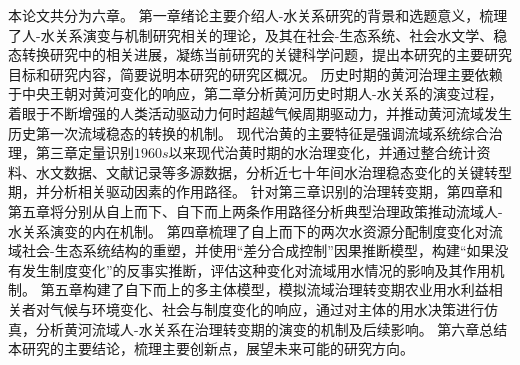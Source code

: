 本论文共分为六章。
第一章绪论主要介绍人-水关系研究的背景和选题意义，梳理了人-水关系演变与机制研究相关的理论，及其在社会-生态系统、社会水文学、稳态转换研究中的相关进展，凝练当前研究的关键科学问题，提出本研究的主要研究目标和研究内容，简要说明本研究的研究区概况。
历史时期的黄河治理主要依赖于中央王朝对黄河变化的响应，第二章分析黄河历史时期人-水关系的演变过程，着眼于不断增强的人类活动驱动力何时超越气候周期驱动力，并推动黄河流域发生历史第一次流域稳态的转换的机制。
现代治黄的主要特征是强调流域系统综合治理，第三章定量识别$1960s$以来现代治黄时期的水治理变化，并通过整合统计资料、水文数据、文献记录等多源数据，分析近七十年间水治理稳态变化的关键转型期，并分析相关驱动因素的作用路径。
针对第三章识别的治理转变期，第四章和第五章将分别从自上而下、自下而上两条作用路径分析典型治理政策推动流域人-水关系演变的内在机制。
第四章梳理了自上而下的两次水资源分配制度变化对流域社会-生态系统结构的重塑，并使用“差分合成控制”因果推断模型，构建“如果没有发生制度变化”的反事实推断，评估这种变化对流域用水情况的影响及其作用机制。
第五章构建了自下而上的多主体模型，模拟流域治理转变期农业用水利益相关者对气候与环境变化、社会与制度变化的响应，通过对主体的用水决策进行仿真，分析黄河流域人-水关系在治理转变期的演变的机制及后续影响。
第六章总结本研究的主要结论，梳理主要创新点，展望未来可能的研究方向。